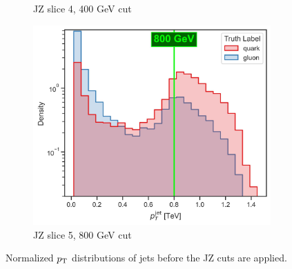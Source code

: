 \begin{figure}[!htb]
\begin{subfigure}[t]{0.49\textwidth}
        \caption{JZ slice 4, 400 GeV cut}
        \label{fig:jz_separete_4}
    \end{subfigure}
    \begin{subfigure}[t]{0.49\textwidth}
        \centering
        \includegraphics[width=\linewidth]{src/plots/pt_jet_label_5.jpg}
        \caption{JZ slice 5, 800 GeV cut}
        \label{fig:jz_separete_5}
    \end{subfigure}
    \caption{Normalized $p_\text{T}$ distributions of jets before the JZ cuts are applied.}
    \label{fig:jz_separete}
\end{figure}

